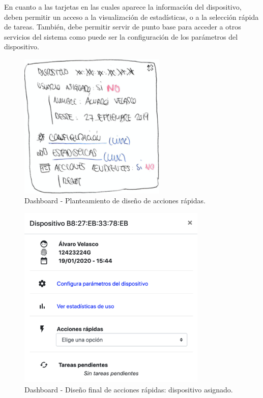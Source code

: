\begin{enumerate}
    En cuanto a las tarjetas en las cuales aparece la información del dispositivo, deben permitir un acceso a la visualización de estadísticas, o a la selección rápida de tareas. También, debe permitir servir de punto base para acceder a otros servicios del sistema como puede ser la configuración de los parámetros del dispositivo.
    
    \begin{figure}[H]   
        \centering
        \includegraphics[width=7cm]{./img/web/devices/dev.quick.pre.png}
        \caption{Dashboard - Planteamiento de diseño de acciones rápidas.}
        \label{fig:web.dir}
    \end{figure}    
    
    \begin{figure}[H]   
        \centering
        \includegraphics[width=9cm]{./img/web2/home.device.info.user}
        \caption{Dashboard - Diseño final de acciones rápidas: dispositivo asignado.}
        \label{fig:web.dir}
    \end{figure}
    

\end{enumerate}
